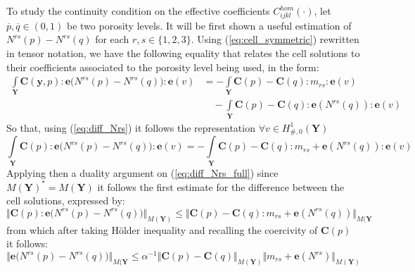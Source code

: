 To study the continuity condition on the effective coefficients $C^{hom}_{ijkl}(\cdot)$, let $\overline{p},\overline{q} \in (0,1)$ be two porosity levels. It will be first shown a useful estimation of $N^{rs}(p)-N^{rs}(q)$ for each $r,s \in \{1,2,3\}$. 
Using (\ref{eq:cell_symmetric}) rewritten in tensor notation, we have the following equality that relates the cell solutions to their coefficients associated to the porosity level being used, in the form:
\begin{equation}
    \label{eq:diff_Nrs}
    \begin{aligned}
        \int\limits_{\mathbf{Y}} \mathbf{C}(\mathbf{y},p):\mathbf{e}\big( N^{rs}(p)-N^{rs}(q) \big) : \mathbf{e}(v) & =  -\int\limits_{\mathbf{Y}} \mathbf{C}(p)-\mathbf{C}(q) : m_{rs}:\mathbf{e}(v) \\
        & \quad - \int\limits_{\mathbf{Y}}\mathbf{C}(p)-\mathbf{C}(q):\mathbf{e}(N^{rs}(q)):\mathbf{e}(v)
    \end{aligned}
\end{equation}
So that, using (\ref{eq:diff_Nrs}) it follows the representation $\forall v \in H^1_{\#,0}(\mathbf{Y})$
\begin{equation}
    \label{eq:diff_Nrs_full}
    \int\limits_{\mathbf{Y}} \mathbf{C}(p):\mathbf{e}\big(N^{rs}(p)-N^{rs}(q)\big):\mathbf{e}(v) = -\int\limits_{\mathbf{Y}} \mathbf{C}(p)-\mathbf{C}(q):m_{rs}+\mathbf{e}(N^{rs}(q)):\mathbf{e}(v)
\end{equation}
Applying then a duality argument on (\ref{eq:diff_Nrs_full}) since $M(\mathbf{Y})^* = M(\mathbf{Y})$ it follows the first estimate for the difference between the cell solutions, expressed by:
\begin{equation*}
    \Vert \mathbf{C}(p):\mathbf{e}\big(N^{rs}(p)-N^{rs}(q)\big) \Vert_{M(\mathbf{Y})} \leq \Vert \mathbf{C}(p)-\mathbf{C}(q):m_{rs}+\mathbf{e}(N^{rs}(q))\Vert_{M(\mathbf{Y}}
\end{equation*}
from which after taking H\"{o}lder inequality and recalling the coercivity of $\mathbf{C}(p)$ it follows:
\begin{equation}
    \label{eq:ineq_diff_N}
    \Vert \mathbf{e}\big(N^{rs}(p)-N^{rs}(q)\big) \Vert_{M(\mathbf{Y}} \leq \alpha^{-1}\Vert \mathbf{C}(p)-\mathbf{C}(q) \Vert_{M(\mathbf{Y})} \Vert m_{rs}+\mathbf{e}(N^{rs}) \Vert_{M(\mathbf{Y})}
\end{equation}

